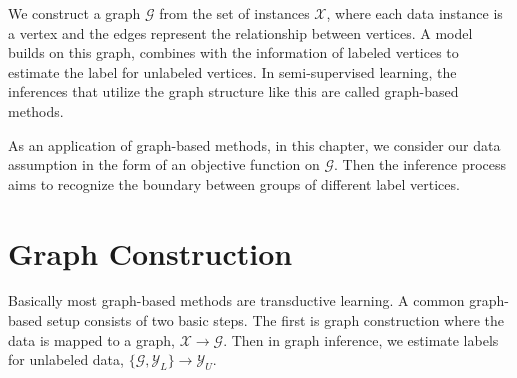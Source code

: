 We construct a graph $\mathcal{G}$ from the set of instances $\mathcal{X}$, where each data instance is a vertex and the edges represent the relationship between vertices. A model builds on this graph, combines with the information of labeled vertices to estimate the label for unlabeled vertices. In semi-supervised learning, the inferences that utilize the graph structure like this are called graph-based methods.

As an application of graph-based methods, in this chapter, we consider our data assumption in the form of an objective function on $\mathcal{G}$. Then the inference process aims to recognize the boundary between groups of different label vertices.


\section{Graph Construction}
\label{section3: Graph Construction}

Basically most graph-based methods are transductive learning. A common graph-based setup consists of two basic steps. The first is graph construction where the data is mapped to a graph, $\mathcal{X} \rightarrow \mathcal{G}$. Then in graph inference, we estimate labels for unlabeled data, $\{ \mathcal{G}, \mathcal{Y}_L \} \rightarrow \mathcal{Y}_U$.

